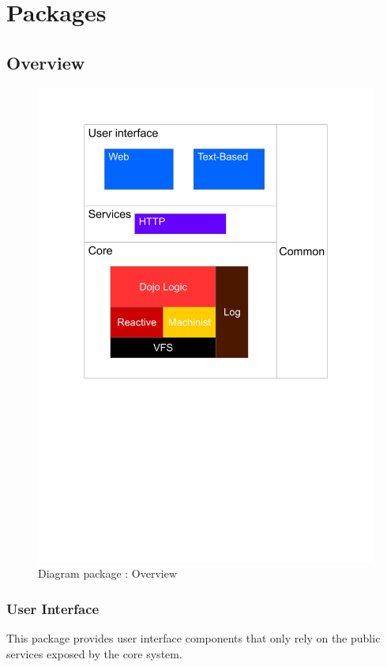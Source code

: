 \chapter{Packages}

\section{Overview}
	\begin{figure}[ht]
			\begin{center}
				\includegraphics[width=\textwidth,  trim=2cm 12cm 2cm 1cm]{UML_figure/packages/general/DP_General.pdf}
				\caption{Diagram package : Overview}
			\end{center}
	\end{figure}
	\newpage
	\subsection{User Interface}
		This package provides user interface components that only rely on the public services exposed by the core system.
